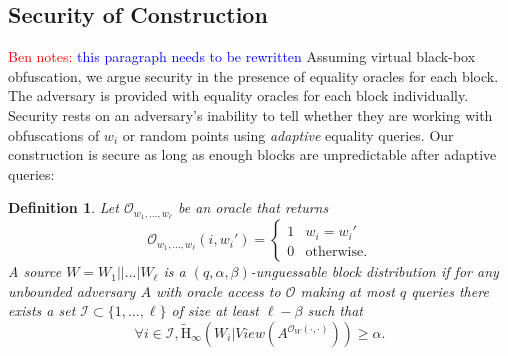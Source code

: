 \documentclass[11pt]{article}
\newcommand{\Hav}{\tilde{\mathrm{H}}_\infty}
\newtheorem{definition}[theorem]{Definition}
\newcommand{\authnote}[2]{{\textcolor{red}{\textsf{#1 notes: }\textcolor{blue}{ #2}}\marginpar{\textcolor{red}{\textbf{!!!!!}}}}}
\newcommand{\authnote}[2]{}
\newcommand{\bnote}[1]{{\authnote{Ben}{#1}}}
\begin{document}
\subsection{Security of Construction}
\label{sec:sec of construction}
\bnote{this paragraph needs to be rewritten}
Assuming virtual black-box obfuscation, we argue security in the presence of equality oracles for each block.  The adversary is provided with equality oracles for each block individually.  Security rests on an adversary's inability to tell whether they are working with obfuscations of $w_i$ or random points using \emph{adaptive} equality queries.  Our construction is secure as long as enough blocks are unpredictable after adaptive queries:

\begin{definition}
\label{def:block guessable}
Let $\mathcal{O}_{w_1,..., w_\ell}$ be an oracle that returns \[\mathcal{O}_{w_1,..., w_\ell}(i, w_i')=
\begin{cases}
1 & w_i = w_i'\\
0 & \text{otherwise}.
\end{cases}
\]
A source $W = W_1||...|W_\ell$ is a $(q, \alpha, \beta)$-\emph{unguessable block distribution} if for any unbounded adversary $A$ with oracle access to $\mathcal{O}$ making at most $q$ queries there exists a set $\mathcal{I}\subset\{1,..., \ell\}$ of size at least $\ell -\beta$ such that 
\[
\forall i\in \mathcal{I}, \Hav(W_i |View(A^{\mathcal{O}_{W}(\cdot, \cdot)}))\geq \alpha.
\]
\end{definition}
\end{document}
